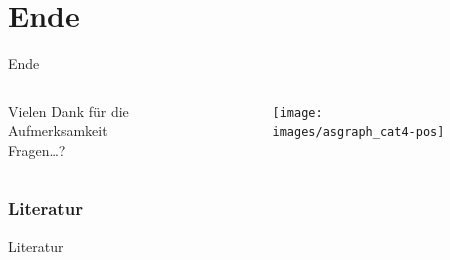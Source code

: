 \documentclass[ngerman,compress,hyperref={bookmarks}]{beamer}
\begin{document}
\part{Ende}
\begin{frame}{Ende}
\begin{columns}[t]
\begin{column}{0.5\textwidth}
 \begin{center}
 \vspace{1cm}
 Vielen Dank für die Aufmerksamkeit\\
 \vspace{1.5cm}
 Fragen\ldots?
 \end{center}
\end{column}
\begin{column}{0.5\textwidth}
 \vspace{-1cm}
 \begin{figure}
  \label{asngraphs2}
  \texttt{[image: images/asgraph\_cat4-pos]}
 \end{figure}
\end{column}
\end{columns}
\end{frame}

\section{Literatur}
\begin{frame}{Literatur}
\scriptsize

%

\end{frame}
\end{document}
